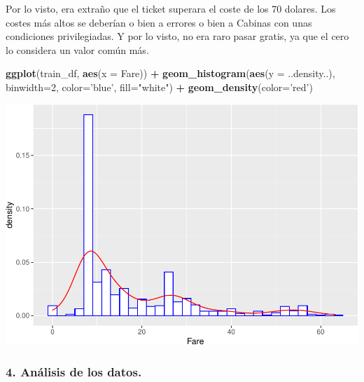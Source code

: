 \documentclass[]{article}
\newenvironment{Shaded}{\begin{snugshade}}{\end{snugshade}}
\newcommand{\CommentTok}[1]{\textcolor[rgb]{0.56,0.35,0.01}{\textit{#1}}}
\newcommand{\DataTypeTok}[1]{\textcolor[rgb]{0.13,0.29,0.53}{#1}}
\newcommand{\DecValTok}[1]{\textcolor[rgb]{0.00,0.00,0.81}{#1}}
\newcommand{\KeywordTok}[1]{\textcolor[rgb]{0.13,0.29,0.53}{\textbf{#1}}}
\newcommand{\NormalTok}[1]{#1}
\newcommand{\OperatorTok}[1]{\textcolor[rgb]{0.81,0.36,0.00}{\textbf{#1}}}
\newcommand{\StringTok}[1]{\textcolor[rgb]{0.31,0.60,0.02}{#1}}
\begin{document}
\begin{Shaded}
\end{Shaded}

Por lo visto, era extraño que el ticket superara el coste de los 70
dolares. Los costes más altos se deberían o bien a errores o bien a
Cabinas con unas condiciones privilegiadas. Y por lo visto, no era raro
pasar gratis, ya que el cero lo considera un valor común más.

\begin{Shaded}
\begin{Highlighting}[]
\KeywordTok{ggplot}\NormalTok{(train_df, }\KeywordTok{aes}\NormalTok{(}\DataTypeTok{x =}\NormalTok{ Fare)) }\OperatorTok{+}\StringTok{ }\KeywordTok{geom_histogram}\NormalTok{(}\KeywordTok{aes}\NormalTok{(}\DataTypeTok{y =}\NormalTok{ ..density..), }\DataTypeTok{binwidth=}\DecValTok{2}\NormalTok{, }\DataTypeTok{color=}\StringTok{'blue'}\NormalTok{, }\DataTypeTok{fill=}\StringTok{"white"}\NormalTok{) }\OperatorTok{+}\StringTok{ }\KeywordTok{geom_density}\NormalTok{(}\DataTypeTok{color=}\StringTok{'red'}\NormalTok{)}
\end{Highlighting}
\end{Shaded}

\includegraphics{titanic_data_analysis_PRA2_files/figure-latex/unnamed-chunk-14-1.pdf}

\hypertarget{anuxe1lisis-de-los-datos.}{%
\subsubsection{4. Análisis de los
datos.}\label{anuxe1lisis-de-los-datos.}}
\end{document}
